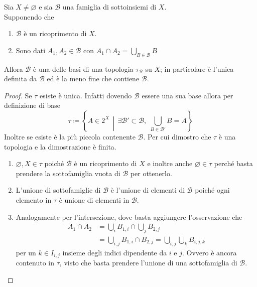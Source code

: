 \begin{theorem}
	\label{thr:set_simil_base_generate_top}
	Sia $X \neq \varnothing$ e sia $\mathcal{B}$ una famiglia di sottoinsiemi di $X$. \\ Supponendo che 
	\begin{enumerate}
		\item $\mathcal{B}$ è un ricoprimento di $X$.
		\item Sono dati $A_1, A_2 \in \mathcal{B}$ con $A_1 \cap A_2 = \bigcup_{B \in \mathcal{B}} B$  
	\end{enumerate}
	Allora $\mathcal{B}$ è una delle basi di una topologia $\tau_\mathcal{B}$ su $X$; in particolare è l'unica definita da $\mathcal{B}$ ed è la meno fine che contiene $\mathcal{B}$.
\end{theorem}
\begin{proof}
	Se $\tau$ esiste è unica. Infatti dovendo $\mathcal{B}$ essere una sua base allora per definizione di base 
	\begin{equation*}	
		\tau \coloneqq \left\{A \in 2^X \,\middle|\, \exists \mathcal{B}' \subset \mathcal{B} , \; \bigcup_{B \in \mathcal{B}'} B = A \right\}
	\end{equation*}
	Inoltre se esiste è la più piccola contenente $\mathcal{B}$.
	Per cui dimostro che $\tau$ è una topologia e la dimostrazione è finita.
	\begin{enumerate}
		\item $\varnothing, X \in \tau$ poiché $\mathcal{B}$ è un ricoprimento di $X$ e inoltre anche $\varnothing \in \tau$ perché basta prendere la sottofamiglia vuota di $\mathcal{B}$ per ottenerlo.
		\item L'unione di sottofamiglie di $\mathcal{B}$ è l'unione di elementi di $\mathcal{B}$ poiché ogni elemento in $\tau$ è unione di elementi in $\mathcal{B}$.
		\item Analogamente per l'intersezione, dove basta aggiungere l'osservazione che 
		\begin{align*}
			A_1 \cap A_2 & = \bigcup_{i} B_{1,i} \cap \bigcup_{j} B_{2,j} \\
				& = \bigcup_{i,j} B_{1,i} \cap B_{2,j} = \bigcup_{i,j} \bigcup_{k} B_{i,j,k}
		\end{align*}
		per un $k \in I_{i,j}$ insieme degli indici dipendente da $i$ e $j$. Ovvero è ancora contenuto in $\tau$, visto che basta prendere l'unione di una sottofamiglia di $\mathcal{B}$.
	\end{enumerate}
\end{proof}


